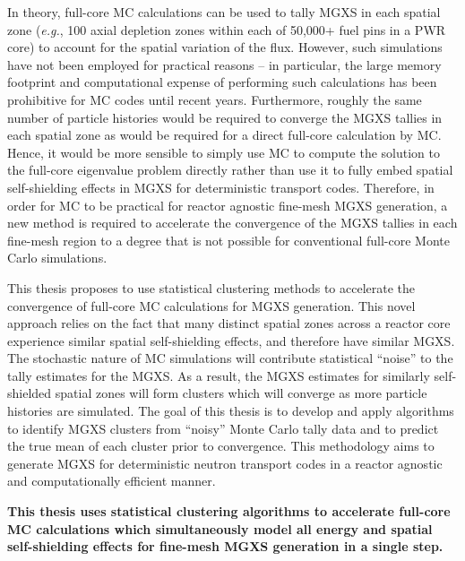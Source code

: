 In theory, full-core \ac{MC} calculations can be used to tally \ac{MGXS} in each spatial zone (\textit{e.g.}, 100 axial depletion zones within each of 50,000+ fuel pins in a \ac{PWR} core) to account for the spatial variation of the flux. However, such simulations have not been employed for practical reasons -- in particular, the large memory footprint and computational expense of performing such calculations has been prohibitive for \ac{MC} codes until recent years. Furthermore, roughly the same number of particle histories would be required to converge the \ac{MGXS} tallies in each spatial zone as would be required for a direct full-core calculation by \ac{MC}. Hence, it would be more sensible to simply use \ac{MC} to compute the solution to the full-core eigenvalue problem directly rather than use it to fully embed spatial self-shielding effects in \ac{MGXS} for deterministic transport codes. Therefore, in order for \ac{MC} to be practical for reactor agnostic fine-mesh \ac{MGXS} generation, a new method is required to accelerate the convergence of the \ac{MGXS} tallies in each fine-mesh region to a degree that is not possible for conventional full-core Monte Carlo simulations. 

This thesis proposes to use statistical clustering methods to accelerate the convergence of full-core \ac{MC} calculations for \ac{MGXS} generation. This novel approach relies on the fact that many distinct spatial zones across a reactor core experience similar spatial self-shielding effects, and therefore have similar \ac{MGXS}. The stochastic nature of \ac{MC} simulations will contribute statistical ``noise'' to the tally estimates for the \ac{MGXS}. As a result, the \ac{MGXS} estimates for similarly self-shielded spatial zones will form clusters which will converge as more particle histories are simulated. The goal of this thesis is to develop and apply algorithms to identify \ac{MGXS} clusters from ``noisy'' Monte Carlo tally data and to predict the true mean of each cluster prior to convergence. This methodology aims to generate \ac{MGXS} for deterministic neutron transport codes in a reactor agnostic and computationally efficient manner.


\begin{emphbox}
\textbf{This thesis uses statistical clustering algorithms to accelerate full-core \ac{MC} calculations
which simultaneously model all energy and spatial self-shielding effects for fine-mesh \ac{MGXS} generation in a single step.}
\end{emphbox}


